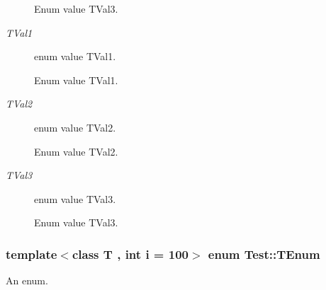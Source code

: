 \begin{Desc}
\begin{description}
Enum value T\-Val3. \item[{\em 
\hypertarget{class_test_ad8d13fe56b896633273087859b89a1a3a6db45e8c0b1d4e96e688fd43d343907a}{T\-Val1}\label{class_test_ad8d13fe56b896633273087859b89a1a3a6db45e8c0b1d4e96e688fd43d343907a}
}]enum value T\-Val1.

Enum value T\-Val1. \item[{\em 
\hypertarget{class_test_ad8d13fe56b896633273087859b89a1a3a13b0433f996716c25158cecf9ee545c4}{T\-Val2}\label{class_test_ad8d13fe56b896633273087859b89a1a3a13b0433f996716c25158cecf9ee545c4}
}]enum value T\-Val2.

Enum value T\-Val2. \item[{\em 
\hypertarget{class_test_ad8d13fe56b896633273087859b89a1a3a5642b0033d6d17c4c9bee72133059f26}{T\-Val3}\label{class_test_ad8d13fe56b896633273087859b89a1a3a5642b0033d6d17c4c9bee72133059f26}
}]enum value T\-Val3.

Enum value T\-Val3. \end{description}
\end{Desc}

\hypertarget{class_test_ad8d13fe56b896633273087859b89a1a3}{
\subsubsection[{T\-Enum}]{\setlength{\rightskip}{0pt plus 5cm}template$<$class T , int i = 100$>$ enum {\bf Test\-::\-T\-Enum}}}\label{class_test_ad8d13fe56b896633273087859b89a1a3}


An enum. 


